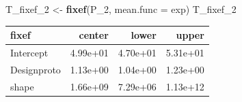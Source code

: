 \documentclass[]{svmono}
\newenvironment{Shaded}{\begin{snugshade}}{\end{snugshade}}
\newcommand{\KeywordTok}[1]{\textcolor[rgb]{0.13,0.29,0.53}{\textbf{#1}}}
\newcommand{\DataTypeTok}[1]{\textcolor[rgb]{0.13,0.29,0.53}{#1}}
\newcommand{\DecValTok}[1]{\textcolor[rgb]{0.00,0.00,0.81}{#1}}
\newcommand{\StringTok}[1]{\textcolor[rgb]{0.31,0.60,0.02}{#1}}
\newcommand{\OperatorTok}[1]{\textcolor[rgb]{0.81,0.36,0.00}{\textbf{#1}}}
\newcommand{\NormalTok}[1]{#1}
\begin{document}
\begin{Shaded}
\end{Shaded}

\begin{Shaded}
\begin{Highlighting}[]
\NormalTok{T_fixef_}\DecValTok{2}\NormalTok{ <-}\StringTok{ }\KeywordTok{fixef}\NormalTok{(P_}\DecValTok{2}\NormalTok{, }\DataTypeTok{mean.func =}\NormalTok{ exp)}
\NormalTok{T_fixef_}\DecValTok{2}
\end{Highlighting}
\end{Shaded}

\begin{longtable}[]{@{}lrrr@{}}
\toprule
fixef & center & lower & upper\tabularnewline
\midrule
\endhead
Intercept & 4.99e+01 & 4.70e+01 & 5.31e+01\tabularnewline
Designproto & 1.13e+00 & 1.04e+00 & 1.23e+00\tabularnewline
shape & 1.66e+09 & 7.29e+06 & 1.13e+12\tabularnewline
\bottomrule
\end{longtable}
\end{document}
